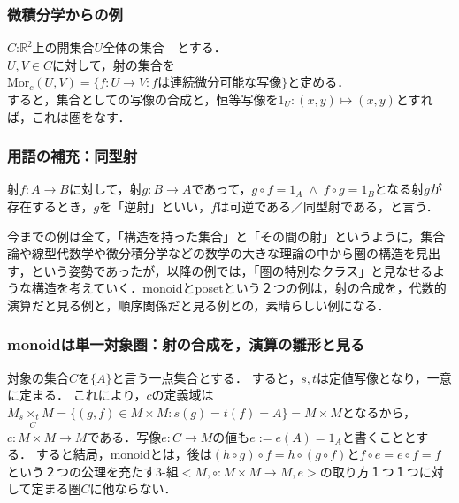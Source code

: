 \documentclass[uplatex, 12pt, a4paper, dvipdfmx]{jsarticle}
\begin{document}
\subsubsection{微積分学からの例}

$C$:$\mathbb{R}^2$上の開集合$U$全体の集合　とする．\\
$U,V\in C$に対して，射の集合を$\mathrm{Mor}_c(U,V)=\{f:U\longrightarrow V: f\text{は連続微分可能な写像}\}$と定める．\\
すると，集合としての写像の合成と，恒等写像を$1_U:(x,y)\longmapsto (x,y)$とすれば，これは圏をなす．

\subsubsection{用語の補充：同型射}

\begin{shadebox}\begin{definition}[可逆，同型，逆射]
    射$f:A\longrightarrow B$に対して，射$g:B\longrightarrow A$であって，$g\circ f=1_A \; \wedge \; f\circ g=1_B$となる射$g$が存在するとき，$g$を「逆射」といい，$f$は可逆である／同型射である，と言う．
\end{definition}\end{shadebox}
\vspace{5mm}

今までの例は全て，「構造を持った集合」と「その間の射」というように，集合論や線型代数学や微分積分学などの数学の大きな理論の中から圏の構造を見出す，という姿勢であったが，以降の例では，「圏の特別なクラス」と見なせるような構造を考えていく．monoidとposetという２つの例は，射の合成を，代数的演算だと見る例と，順序関係だと見る例との，素晴らしい例になる．

\subsubsection{monoidは単一対象圏：射の合成を，演算の雛形と見る}

対象の集合$C$を$\{ A\}$と言う一点集合とする．
すると，$s,t$は定値写像となり，一意に定まる．
これにより，$c$の定義域は$M_s\underset{C}{\times_t}M=\{ (g,f)\in M\times M : s(g)=t(f)=A \}=M\times M$となるから，$c:M\times M\longrightarrow M$である．写像$e:C\longrightarrow M$の値も$e:=e(A)=1_A$と書くこととする．
すると結局，monoidとは，後は$(h\circ g)\circ f = h\circ (g\circ f)$と$f\circ e=e\circ f = f$という２つの公理を充たす3-組$<M,\circ :M\times M\longrightarrow M,e>$の取り方１つ１つに対して定まる圏$C$に他ならない．\\
\end{document}
